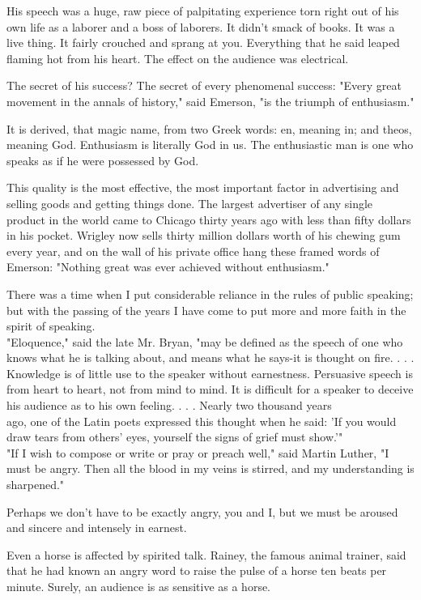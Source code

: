 \documentclass[10pt]{article}
\begin{document}
His speech was a huge, raw piece of palpitating experience torn right out of his own life as a laborer and a boss of laborers. It didn't smack of books. It was a live thing. It fairly crouched and sprang at you. Everything that he said leaped\\
flaming hot from his heart. The effect on the audience was electrical.

The secret of his success? The secret of every phenomenal success: "Every great movement in the annals of history," said Emerson, "is the triumph of enthusiasm."

It is derived, that magic name, from two Greek words: en, meaning in; and theos, meaning God. Enthusiasm is literally God in us. The enthusiastic man is one who speaks as if he were possessed by God.

This quality is the most effective, the most important factor in advertising and selling goods and getting things done. The largest advertiser of any single product in the world came to Chicago thirty years ago with less than fifty dollars in his pocket. Wrigley now sells thirty million dollars worth of his chewing gum every year, and on the wall of his private office hang these framed words of Emerson: "Nothing great was ever achieved without enthusiasm."

There was a time when I put considerable reliance in the rules of public speaking; but with the passing of the years I have come to put more and more faith in the spirit of speaking.\\
"Eloquence," said the late Mr. Bryan, "may be defined as the speech of one who knows what he is talking about, and means what he says-it is thought on fire. . . . Knowledge is of little use to the speaker without earnestness. Persuasive speech is from heart to heart, not from mind to mind. It is difficult for a speaker to deceive his audience as to his own feeling. . . . Nearly two thousand years\\
ago, one of the Latin poets expressed this thought when he said: 'If you would draw tears from others' eyes, yourself the signs of grief must show.'"\\
"If I wish to compose or write or pray or preach well," said Martin Luther, "I must be angry. Then all the blood in my veins is stirred, and my understanding is sharpened."

Perhaps we don't have to be exactly angry, you and I, but we must be aroused and sincere and intensely in earnest.

Even a horse is affected by spirited talk. Rainey, the famous animal trainer, said that he had known an angry word to raise the pulse of a horse ten beats per minute. Surely, an audience is as sensitive as a horse.
\end{document}
